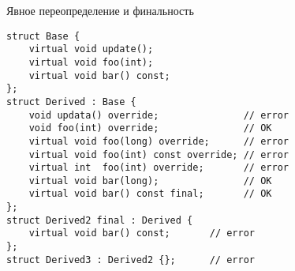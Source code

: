 \documentclass[aspectration=1610,t]{beamer}
\begin{document}
\begin{frame}[fragile]{Явное переопределение и финальность}
    \begin{lstlisting}
struct Base {
    virtual void update();
    virtual void foo(int);
    virtual void bar() const;
};
struct Derived : Base {
    void updata() override;          	  // error
    void foo(int) override;               // OK
    virtual void foo(long) override;      // error
    virtual void foo(int) const override; // error
    virtual int  foo(int) override;       // error
    virtual void bar(long);               // OK
    virtual void bar() const final;       // OK
};
struct Derived2 final : Derived {
    virtual void bar() const;       // error
};
struct Derived3 : Derived2 {};      // error
    \end{lstlisting}
\end{frame}

\end{document}
